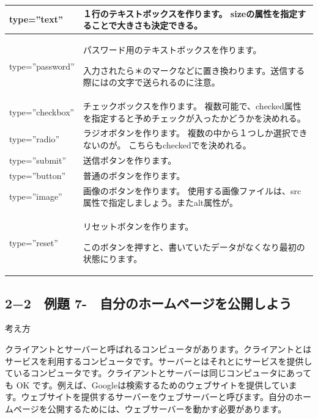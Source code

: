 \documentclass[a4paper,12pt,dvipdfmx]{jarticle}
\newcounter{Exercise}
\newcounter {PagePtr}
\renewcommand\theExercise{\textbf{例題 7-\arabic{Exercise}}}
\begin{document}
\begin{flushleft}
	\tablefirsthead{}
	\tablehead{}
	\tabletail{}
	\tablelasttail{}
	\begin{supertabular}{|m{3.4459999cm}|m{7.9160004cm}|}
		\hline
		type=”text” &
		１行のテキストボックスを作ります。\newline
		sizeの属性を指定することで大きさも決定できる。\\\hline
		type=”password” &
		パスワード用のテキストボックスを作ります。\newline

		入力されたら＊のマークなどに置き換わります。送信する際にはの文字で送られるのに注意。\\\hline
		type=”checkbox” &
		チェックボックスを作ります。
		複数可能で、checked属性を指定すると予めチェックが入ったかどうかを決めれる。\\\hline
		type=”radio” &
		ラジオボタンを作ります。
		複数の中から１つしか選択できないのが。\newline
		こちらもcheckedでを決めれる。\\\hline
		type=”submit” &
		送信ボタンを作ります。\\\hline
		type=”button” &
		普通のボタンを作ります。\\\hline
		type=”image” &
		画像のボタンを作ります。\newline
		使用する画像ファイルは、src属性で指定しましょう。またalt属性が。\\\hline
		type=”reset” &
		リセットボタンを作ります。

		このボタンを押すと、書いていたデータがなくなり最初の状態にります。\\\hline
	\end{supertabular}
\end{flushleft}

\bigskip

\clearpage
{}\label{P:HP}
\subsection*{2−2　\theExercise　自分のホームページを公開しよう\label{E:myHP}}
考え方


クライアントとサーバーと呼ばれるコンピュータがあります。クライアントとはサービスを利用するコンピュータです。サーバーとはそれとにサービスを提供しているコンピュータです。クライアントとサーバーは同じコンピュータにあっても
OK です。例えば、Googleは検索するためのウェブサイトを提供しています。ウェブサイトを提供するサーバーをウェブサーバーと呼びます。自分のホームページを公開するためには、ウェブサーバーを動かす必要があります。
\end{document}
